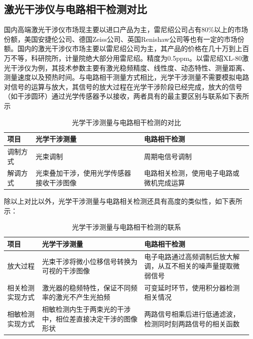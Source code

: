 \documentclass[11pt]{article}
\begin{document}
\subsection{激光干涉仪与电路相干检测对比}
国内高端激光干涉仪市场现主要以进口产品为主，雷尼绍公司占有80\%以上的市场份额，美国安捷伦公司、德国Zeiss公司、英国Renishaw公司等也有一定的市场份额。国内的激光干涉仪市场主要以雷尼绍公司为主，其产品的价格在几十万到上百万不等，科研院所，计量院绝大部分用雷尼绍。精度为0.5ppm。以雷尼绍XL-80激光干涉仪为例\cite{plc_renishaw_nodate}，其技术参数主要有激光稳频精度、线性度、动态特性、测量距离、测量速度以及预热时间。与电路相干测量方式相比，光学干涉测量不需要模拟电路对信号的运算与放大，其信号的放大过程在光学干涉阶段已经完成，放大的信号（如干涉圆环）通过光学传感器予以接收，两者具有的最主要区别与联系如下表所示
\begin{table}
  \caption{光学干涉测量与电路相干检测的对比}
\begin{tabular}{|m{}<{\centering}|m{}<{\centering}|m{}<{\centering}|}
  \hline
  项目&光学干涉测量&电路相干检测\\\hline
  调制方式&光束调制&周期电信号调制\\\hline
  解调方式&光束叠加干涉，使用光学传感器接收干涉图像&电路相关检测，使用电子电路或微机完成运算\\\hline
\end{tabular}
\end{table}
除以上对比以外，光学干涉测量与电路相关检测还具有高度的类似性，如下表所示：
\begin{table}
  \caption{光学干涉测量与电路相干检测的联系}
\begin{tabular}{|m{}<{\centering}|m{}<{\centering}|m{}<{\centering}|}
  \hline
  项目&光学干涉测量&电路相干检测\\\hline
  放大过程&光束干涉将微小位移信号转换为可视的干涉图像&电子电路通过高频调制后放大解调，从互不相关的噪声量提取微弱信号\\\hline
  相关检测实现方式&激光器的稳频特性，保证不同频率的激光不产生光拍频&可变延时环节，使用积分器检测相关情况\\\hline
  相敏检测实现方式&相敏检测内生于两束光的干涉中，相位差直接决定干涉的图像形状&两路信号相乘后进行低通滤波，检测同时刻两路信号的相关函数\\\hline
\end{tabular}
\end{table}
\newpage
\printbibliography[heading=bibliography,title=参考文献]
\end{document}
